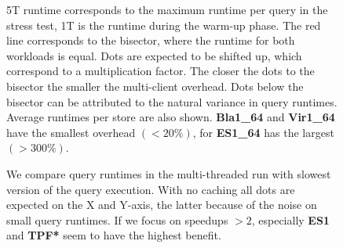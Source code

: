 \documentclass[twocolumn]{bmcart}%
\def\texttt{[image: ]}
\begin{document}
\begin{backmatter}
\begin{figure}[ht!]
	\centering
 	\caption{}
 	\label{fig:Fig06_WatdivTemplateTypes}
\end{figure}
   
\begin{figure}[ht!]
	\centering
	\caption{ 
		5T runtime corresponds to the maximum runtime per query in the stress test, 1T is the runtime during the warm-up phase. The red line corresponds to the bisector, where the runtime for both workloads is equal. Dots are expected to be shifted up, which correspond to a multiplication factor. The closer the dots to the bisector the smaller the multi-client overhead. Dots below the bisector can be attributed to the natural variance in query runtimes. Average runtimes per store are also shown. \textbf{Bla1\_64} and \textbf{Vir1\_64} have the smallest overhead $(< 20\%)$, for \textbf{ES1\_64} has the largest $(> 300\%)$.
	}
	\label{fig:Fig07_Watdiv_SingleMultiClient}
\end{figure}

\begin{figure}[ht!]
	\centering
	\caption{ We compare query runtimes in the multi-threaded run with slowest version of the query execution. With no caching all dots are expected on the X and Y-axis, the latter because of the noise on small query runtimes. If we focus on speedups $> 2$, especially \textbf{ES1} and \textbf{TPF*} seem to have the highest benefit.  }
	\label{fig:Fig08_Watdiv_caching}
\end{figure}


\end{backmatter}
\end{document}
